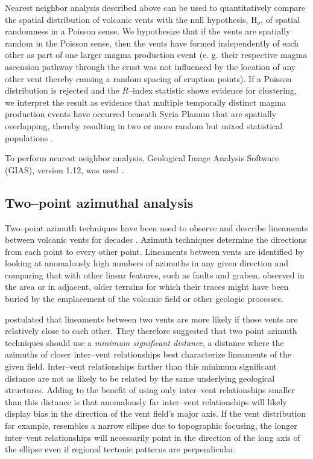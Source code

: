 Nearest neighbor analysis described above can be used to quantitatively compare the spatial distribution of volcanic vents with the null hypothesis, H$_o$, of spatial randomness in a Poisson sense. We hypothesize that if the vents are spatially random in the Poisson sense, then the vents have formed independently of each other as part of one larger magma production event (e. g. their respective magma ascension pathway through the crust was not influenced by the location of any other vent thereby causing a random spacing of eruption points). If a Poisson distribution is rejected and the $R$--index statistic shows evidence for clustering, we interpret the result as evidence that multiple temporally distinct magma production events have occurred beneath Syria Planum that are spatially overlapping, thereby resulting in two or more random but mixed statistical populations \citep{Lutz1986,Lutz1995}.

To perform nearest neighbor analysis, Geological Image Analysis Software (GIAS), version 1.12, was used \citep{Beggan2010,Hamilton2010,Hamilton2011}.

\subsection{Two--point azimuthal analysis}
\label{sec:methodAzimuth}

Two--point azimuth techniques have been used to observe and describe lineaments between volcanic vents for decades \citep{Lutz1986,Wadge1988,Wadge1989,Connor1990,Lutz1995,Bleacher2009,Cebria2011,Roberts2011}. Azimuth techniques determine the directions from each point to every other point. Lineaments between vents are identified by looking at anomalously high numbers of azimuths in any given direction and comparing that with other linear features, such as faults and graben, observed in the area or in adjacent, older terrains for which their traces might have been buried by the emplacement of the volcanic field or other geologic processes.

\citet{Cebria2011} postulated that lineaments between two vents are more likely if those vents are relatively close to each other. They therefore suggested that two point azimuth techniques should use a \textit{minimum significant distance}, a distance where the azimuths of closer inter--vent relationships best characterize lineaments of the given field. Inter--vent relationships farther than this minimum significant distance are not as likely to be related by the same underlying geological structures. Adding to the benefit of using only inter--vent relationships smaller than this distance is that anomalously far inter--vent relationships will likely display bias in the direction of the vent field's major axis. If the vent distribution for example, resembles a narrow ellipse due to topographic focusing, the longer inter--vent relationships will necessarily point in the direction of the long axis of the ellipse even if regional tectonic patterns are perpendicular.

